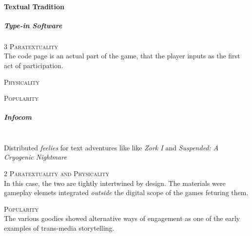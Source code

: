 \documentclass[12pt]{article}
\begin{document}
\paragraph{Textual Tradition}
\subparagraph{Type-in Software}\phantom{.}
\begin{multicols}{3}
    \textsc{Paratextuality}\phantom{.}\\
    The code page is an actual part of the game, that the player inputs as the first act of participation.
\columnbreak\par\textsc{Physicality}\phantom{.}\\
\columnbreak\par\textsc{Popularity}\phantom{.}\\
\end{multicols}

\subparagraph{Infocom}\phantom{.}\\ 
        Distributed \textit{feelies} for text adventures like like \textit{Zork I} \parencite*{zork1980} and \textit{Suspended: A Cryogenic Nightmare} \parencite*{suspended1983}
\begin{multicols}{2}
    \textsc{Paratextuality and Physicality}\phantom{.}\\
    In this case, the two are tightly intertwined by design. The materials were gameplay elemets integrated \textit{outside} the digital scope of the games feturing them.
\columnbreak\par\textsc{Popularity}\phantom{.}\\
    The various goodies showed alternative ways of engagement as one of the early examples of trans-media storytelling.
\end{multicols}
\end{document}
